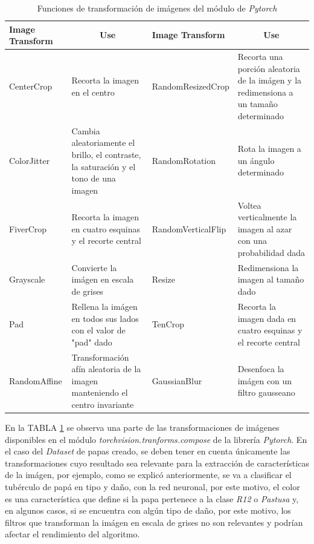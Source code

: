 			\begin{table}[ht]
				\centering
				\begin{tabular}{|p{3cm}|p{4cm}|p{3.8cm}|p{4cm}|}
					\hline
					Image Transform       & \multicolumn{1}{c|}{Use}                                                               & Image Transform       & \multicolumn{1}{c|}{Use}                                                                        \\ \hline
					CenterCrop            & Recorta la imagen en el centro                                                         & RandomResizedCrop     & Recorta una porción aleatoria de la imágen y la redimensiona a un tamaño determinado            \\ \hline
					ColorJitter           & Cambia aleatoriamente el brillo, el contraste, la saturación y el tono de una imagen   & RandomRotation        & Rota la imagen a un ángulo determinado                                                          \\ \hline
					FiverCrop              & Recorta la imagen en cuatro esquinas y el recorte central                              & RandomVerticalFlip    & Voltea verticalmente la imagen al azar con una probabilidad dada                                \\ \hline
					Grayscale             & Convierte la imágen en escala de grises                                                & Resize                & Redimensiona la imagen al tamaño dado                                                           \\ \hline
					Pad                   & Rellena la imágen en todos sus lados con el valor de "pad" dado                        & TenCrop               & Recorta la imagen dada en cuatro esquinas y el recorte central \\ \hline
					RandomAffine          & Transformación afín aleatoria de la imagen manteniendo el centro invariante            & GaussianBlur          & Desenfoca la imágen con un filtro gausseano                                                                                                                     \\ \hline
				\end{tabular}
				\caption{Funciones de transformación de imágenes del módulo de \textit{Pytorch}}
				\label{table:Filters1}
			\end{table}
			
			En la TABLA \ref{table:Filters1} se observa una parte de las transformaciones de imágenes disponibles en el módulo \textit{torchvision.tranforms.compose} de la librería \textit{Pytorch}. En el caso del \textit{Dataset} de papas creado, se deben tener en cuenta únicamente las transformaciones cuyo resultado sea relevante para la extracción de características de la imágen, por ejemplo, como se explicó anteriormente, se va a clasificar el tubérculo de papá en tipo y daño, con la red neuronal, por este motivo, el color es una característica que define si la papa pertenece a la clase \textit{R12} o \textit{Pastusa} y, en algunos casos, si se encuentra con algún tipo de daño, por este motivo, los filtros que transforman la imágen en escala de grises no son relevantes y podrían afectar el rendimiento del algoritmo.
		
